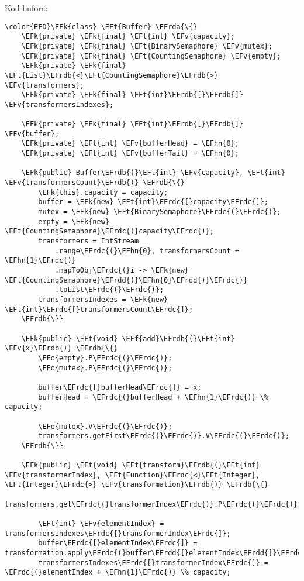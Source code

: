 \documentclass[11pt]{article}
\newcommand{\EFk}[1]{\textcolor{EFk}{#1}} %
\newcommand{\EFf}[1]{\textcolor{EFf}{#1}} %
\newcommand{\EFv}[1]{\textcolor{EFv}{#1}} %
\newcommand{\EFt}[1]{\textcolor{EFt}{#1}} %
\newcommand{\EFo}[1]{\textcolor{EFo}{#1}} %
\newcommand{\EFhn}[1]{\textcolor{EFhn}{#1}} %
\newcommand{\EFrda}[1]{#1} %
\newcommand{\EFrdb}[1]{\textcolor{EFrdb}{#1}} %
\newcommand{\EFrdc}[1]{\textcolor{EFrdc}{#1}} %
\newcommand{\EFrdd}[1]{\textcolor{EFrdd}{#1}} %
\begin{document}
Kod bufora:
\begin{Code}
\begin{Verbatim}
\color{EFD}\EFk{class} \EFt{Buffer} \EFrda{\{}
    \EFk{private} \EFk{final} \EFt{int} \EFv{capacity};
    \EFk{private} \EFk{final} \EFt{BinarySemaphore} \EFv{mutex};
    \EFk{private} \EFk{final} \EFt{CountingSemaphore} \EFv{empty};
    \EFk{private} \EFk{final} \EFt{List}\EFrdb{<}\EFt{CountingSemaphore}\EFrdb{>} \EFv{transformers};
    \EFk{private} \EFk{final} \EFt{int}\EFrdb{[}\EFrdb{]} \EFv{transformersIndexes};

    \EFk{private} \EFk{final} \EFt{int}\EFrdb{[}\EFrdb{]} \EFv{buffer};
    \EFk{private} \EFt{int} \EFv{bufferHead} = \EFhn{0};
    \EFk{private} \EFt{int} \EFv{bufferTail} = \EFhn{0};

    \EFk{public} Buffer\EFrdb{(}\EFt{int} \EFv{capacity}, \EFt{int} \EFv{transformersCount}\EFrdb{)} \EFrdb{\{}
        \EFk{this}.capacity = capacity;
        buffer = \EFk{new} \EFt{int}\EFrdc{[}capacity\EFrdc{]};
        mutex = \EFk{new} \EFt{BinarySemaphore}\EFrdc{(}\EFrdc{)};
        empty = \EFk{new} \EFt{CountingSemaphore}\EFrdc{(}capacity\EFrdc{)};
        transformers = IntStream
            .range\EFrdc{(}\EFhn{0}, transformersCount + \EFhn{1}\EFrdc{)}
            .mapToObj\EFrdc{(}i -> \EFk{new} \EFt{CountingSemaphore}\EFrdd{(}\EFhn{0}\EFrdd{)}\EFrdc{)}
            .toList\EFrdc{(}\EFrdc{)};
        transformersIndexes = \EFk{new} \EFt{int}\EFrdc{[}transformersCount\EFrdc{]};
    \EFrdb{\}}

    \EFk{public} \EFt{void} \EFf{add}\EFrdb{(}\EFt{int} \EFv{x}\EFrdb{)} \EFrdb{\{}
        \EFo{empty}.P\EFrdc{(}\EFrdc{)};
        \EFo{mutex}.P\EFrdc{(}\EFrdc{)};

        buffer\EFrdc{[}bufferHead\EFrdc{]} = x;
        bufferHead = \EFrdc{(}bufferHead + \EFhn{1}\EFrdc{)} \% capacity;

        \EFo{mutex}.V\EFrdc{(}\EFrdc{)};
        transformers.getFirst\EFrdc{(}\EFrdc{)}.V\EFrdc{(}\EFrdc{)};
    \EFrdb{\}}

    \EFk{public} \EFt{void} \EFf{transform}\EFrdb{(}\EFt{int} \EFv{transformerIndex}, \EFt{Function}\EFrdc{<}\EFt{Integer}, \EFt{Integer}\EFrdc{>} \EFv{transformation}\EFrdb{)} \EFrdb{\{}
        transformers.get\EFrdc{(}transformerIndex\EFrdc{)}.P\EFrdc{(}\EFrdc{)};

        \EFt{int} \EFv{elementIndex} = transformersIndexes\EFrdc{[}transformerIndex\EFrdc{]};
        buffer\EFrdc{[}elementIndex\EFrdc{]} = transformation.apply\EFrdc{(}buffer\EFrdd{[}elementIndex\EFrdd{]}\EFrdc{)};
        transformersIndexes\EFrdc{[}transformerIndex\EFrdc{]} = \EFrdc{(}elementIndex + \EFhn{1}\EFrdc{)} \% capacity;


\end{Verbatim}
\end{Code}
\end{document}
